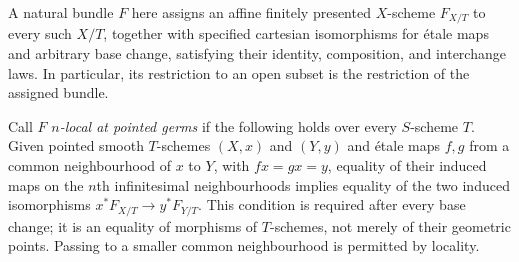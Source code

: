 A natural bundle $F$ here assigns an affine finitely presented $X$-scheme
$F_{X/T}$ to every such $X/T$, together with specified cartesian
isomorphisms for \'{e}tale maps and arbitrary base change, satisfying their
identity, composition, and interchange laws. In particular, its restriction
to an open subset is the restriction of the assigned bundle.

Call $F$ \emph{$n$-local at pointed germs} if the following holds over every
$S$-scheme $T$. Given pointed smooth $T$-schemes $(X,x)$ and $(Y,y)$ and
\'{e}tale maps $f,g$ from a common neighbourhood of $x$ to $Y$, with
$f x=g x=y$, equality of their induced maps on the $n$th infinitesimal
neighbourhoods implies equality of the two induced isomorphisms
$x^*F_{X/T}\to y^*F_{Y/T}$. This condition is required after every base
change; it is an equality of morphisms of $T$-schemes, not merely of their
geometric points. Passing to a smaller common neighbourhood is permitted
by locality.

